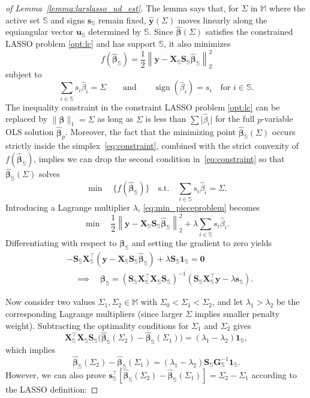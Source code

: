 \documentclass[10pt,a4paper]{amsart}
\newcommand\absbig[1]{\big\lvert#1\big\rvert}
\newcommand{\bG}{{\bm{G}}}
\newcommand{\bS}{{\bm{S}}}
\newcommand{\bX}{{\bm{X}}}
\newcommand{\bbeta}{{\boldsymbol\beta}}
\newcommand{\bone}{{\bm{1}}}
\newcommand{\bs}{{\bm{s}}}
\newcommand{\bu}{{\bm{u}}}
\newcommand{\by}{{\bm{y}}}
\newcommand{\bzero}{\boldsymbol{0}}
\newcommand\normonebig[1]{\big\lVert#1\big\rVert_1}
\newcommand\normtwo[1]{\left\lVert#1\right\rVert_2}
\def\sM{{\mathbb{M}}}
\def\sS{{\mathbb{S}}}
\DeclareMathOperator{\sign}{sign}
\newcommand{\widehatbbeta}{{\widehat\bbeta}}
\newcommand{\widehatbeta}{{\widehat\beta}}
\newcommand{\widehatby}{\widehat{\bm{y}}}
\begin{document}
\begin{proof}[of Lemma~\ref{lemma:larslasso_ud_est}]
The lemma says that, for $\Sigma$ in $\sM$ where the active set $\sS$ and signs $\bs_{\sS} $
remain fixed, $\widehatby(\Sigma)$ moves linearly along the equiangular vector $\bu_\sS$ determined by $\sS$. 
Since $\widehatbbeta(\Sigma)$ satisfies the constrained LASSO problem \eqref{opt:lc} and has support $\sS$, it also minimizes
\begin{equation*}
f(\widehatbbeta_\sS) = \frac{1}{2}\normtwo{\by - \bX_\sS \bS_\sS \widehatbbeta_\sS}^2
\end{equation*}
subject to
\begin{equation}\label{eq:constraint}
\sum_{i \in \sS} s_i \widehatbeta_i = \Sigma 
\qquad \text{and} \qquad 
\sign(\widehatbeta_i) = s_i \quad \text{for } i \in \sS.
\end{equation}
The inequality constraint in the constraint LASSO problem \eqref{opt:lc} can be replaced by $\normonebig{\widehatbbeta} = \Sigma$ as long as $\Sigma$ is less than $\sum \absbig{\widehatbeta_i}$ for the full $p$-variable OLS solution $\widehatbbeta_p$.
Moreover, the fact that the minimizing point $\widehatbbeta_\sS(\Sigma)$ occurs strictly inside the simplex~\eqref{eq:constraint}, combined with the strict convexity of $f(\widehatbbeta_\sS)$, implies we can drop the second condition in~\eqref{eq:constraint} so that $\widehatbbeta_\sS(\Sigma)$ solves
\begin{equation}\label{eq:min_pieceproblem}
\min \quad \{ f(\widehatbbeta_\sS) \} \quad \text{s.t.} \quad \sum_{i \in \sS} s_i \widehatbeta_i = \Sigma.
\end{equation}
Introducing a Lagrange multiplier $\lambda$, \eqref{eq:min_pieceproblem} becomes
$$
\min \quad \frac{1}{2} \normtwo{\by - \bX_\sS \bS_\sS \widehatbbeta_\sS}^2 + \lambda \sum_{i \in \sS} s_i \widehatbeta_i.
$$
Differentiating with respect to $\bbeta_\sS$ and setting the gradient to zero yields
\begin{align}
&- \bS_\sS \bX_\sS^\top (\by - \bX_\sS \bS_\sS \widehatbbeta_\sS) + \lambda \bS_\sS \bone_\sS = \bzero \label{eq:larslasso_stat_condition010} \\
&\quad \implies\quad
\bbeta_\sS = (\bS_\sS\bX_\sS^\top \bX_\sS\bS_\sS)^{-1}(\bS_\sS\bX_\sS^\top \by - \lambda \bs_\sS). \label{eq:larslasso_stat_condition}
\end{align}






Now consider two values $\Sigma_1, \Sigma_2\in \sM$ with $\Sigma_0 < \Sigma_1 < \Sigma_2$, 
and let $\lambda_1 > \lambda_2$ be the corresponding Lagrange multipliers  (since larger $\Sigma$ implies smaller penalty weight).  
Subtracting the optimality conditions for $\Sigma_1$ and $\Sigma_2$ gives
$$
\bX_\sS^\top \bX_\sS \bS_\sS \big(\widehatbbeta_\sS(\Sigma_2) - \widehatbbeta_\sS(\Sigma_1)\big) = (\lambda_1 - \lambda_2) \bone_\sS,
$$
which implies
$$
\widehatbbeta_\sS(\Sigma_2) - \widehatbbeta_\sS(\Sigma_1) = (\lambda_1 - \lambda_2) \bS_\sS \bG_\sS^{-1} \bone_\sS.
$$
However, we can also prove $\bs_\sS^\top [\widehatbbeta_\sS(\Sigma_2) - \widehatbbeta_\sS(\Sigma_1)] = \Sigma_2 - \Sigma_1$ according to the LASSO definition:


\end{proof}
\end{document}
